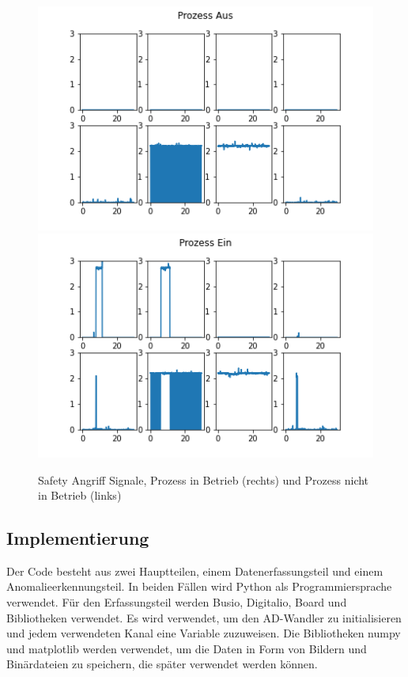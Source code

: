 \documentclass[12pt,a4paper]{scrartcl}
\numberwithin{equation}{section}
\begin{document}
\begin{figure}[ht!]
	\centering
	  \includegraphics[scale=0.5]{sis_angriff.png}
	  \includegraphics[scale=0.5]{sis_angriff_process_on.png}
	  \caption{Safety Angriff Signale, Prozess in Betrieb (rechts) und Prozess nicht in Betrieb (links)}
	\label{sis_angriff_process}
\end{figure}

\subsection{Implementierung}
 
Der Code besteht aus zwei Hauptteilen, einem Datenerfassungsteil und einem Anomalieerkennungsteil. In beiden Fällen wird Python als Programmiersprache verwendet. Für den Erfassungsteil werden Busio, Digitalio, Board und Bibliotheken verwendet. Es wird verwendet, um den AD-Wandler zu initialisieren und jedem verwendeten Kanal eine Variable zuzuweisen. Die Bibliotheken numpy\footnotemark{} und matplotlib\footnotemark{} werden verwendet, um die Daten in Form von Bildern und Binärdateien zu speichern, die später verwendet werden können.
\end{document}
